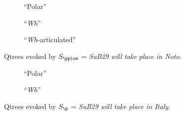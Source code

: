 \begin{figure}[H]
	\centering
	\begin{subfigure}[b]{.2\linewidth}
		\centering
		\caption{``Polar''}\label{fig6:qtree-noto-polar}
	\end{subfigure}\hfill
	\begin{subfigure}[b]{.37\linewidth}
		\centering
		\caption{``\textit{Wh}''}\label{fig6:qtree-noto-wh}
	\end{subfigure}\hfill
	\begin{subfigure}[b]{.37\linewidth}
		\centering
		\caption{``\textit{Wh}-articulated''}\label{fig6:qtree-noto-tiered}
	\end{subfigure}
	\caption[]{Qtrees evoked by $S_{\pplus}$ = \textit{SuB29 will take place in Noto.}}\label{fig6:qtrees-noto}
\end{figure}
\begin{figure}[H]
	\centering
	
	\begin{subfigure}[b]{.45\linewidth}
		\centering
		\caption{``Polar''}\label{fig6:qtree-italy-polar}
	\end{subfigure}\hfill
	\begin{subfigure}[b]{.45\linewidth}
		\centering
		\caption{``\textit{Wh}''}\label{fig6:qtree-italy-wh}
	\end{subfigure}
	\caption[]{Qtrees evoked by $S_{\p}$ = \textit{SuB29 will take place in Italy.}}\label{fig6:qtrees-italy}
\end{figure}

